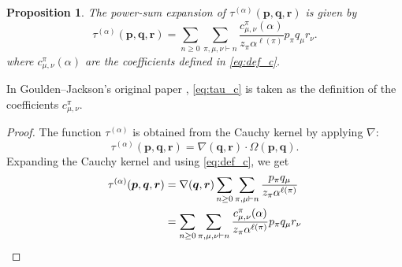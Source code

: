 \documentclass[12pt]{amsart}
\newtheorem{prop}[thm]{Proposition}
\theoremstyle{remark}
\newcommand{\bfp}{\boldsymbol{p}}
\newcommand{\bfq}{\boldsymbol{q}}
\newcommand{\bfr}{\boldsymbol{r}}
\begin{document}
 
\begin{prop}\label{prop:tau_c}
   The power-sum expansion of $\tau^{(\alpha)}(\bfp,\bfq,\bfr)$ is given by
\begin{equation}\label{eq:tau_c}
  \tau^{(\alpha)}(\bfp,\bfq,\bfr)=\sum_{n\geq 0}\sum_{\pi,\mu,\nu\vdash n}\frac{c^\pi_{\mu,\nu}(\alpha)}{z_\pi\alpha^{\ell(\pi)}}p_\pi q_\mu r_\nu.  
\end{equation}
where $c^\pi_{\mu,\nu}(\alpha)$ are the coefficients defined in \cref{eq:def_c}.
\end{prop}
In Goulden--Jackson's original paper \cite{GouldenJackson1996}, \cref{eq:tau_c} is taken as the definition of the coefficients $c^\pi_{\mu,\nu}$.
\begin{proof}
    The function $\tau^{(\alpha)}$ is obtained from the Cauchy kernel by applying $\nabla$:
    \begin{equation}\label{eq:tau-Cauchy}
      \tau^{(\alpha)}(\bfp,\bfq,\bfr)=\nabla(\bfq,\bfr)\cdot \Omega(\bfp,\bfq).  
    \end{equation}
    Expanding the Cauchy kernel and using \cref{eq:def_c}, we get
    \begin{align*}
      \tau^{(\alpha)}(\bfp,\bfq,\bfr)
      &=\nabla(\bfq,\bfr)\sum_{n\geq 0}\sum_{\pi,\mu\vdash n}\frac{p_\pi q_\mu}{z_\pi\alpha^{\ell(\pi)}}\\
      &=\sum_{n\geq 0}\sum_{\pi,\mu,\nu\vdash n} \frac{c^\pi_{\mu,\nu}(\alpha)}{z_\pi\alpha^{\ell(\pi)}}p_\pi q_\mu r_\nu\qedhere
    \end{align*}
\end{proof}
\end{document}
